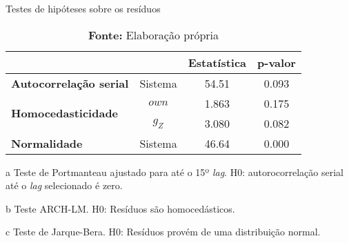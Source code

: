 \begin{table}[H]
\centering
\caption{Testes de hipóteses sobre os resíduos}
\label{testes_resduos}
	\begin{threeparttable}
\begin{tabular}{l|c|c|c}
\hline
\multicolumn{2}{l|}{} & \textbf{Estatística} & \textbf{p-valor} \\ \hline
\textbf{Autocorrelação serial}\tnote{a} & Sistema & 54.51 & 0.093 \\ \hline
\multirow{2}{*}{\textbf{Homocedasticidade}\tnote{b}} & $own$ & 1.863 & 0.175 \\ \cline{2-4} 
 & $g_Z$ & 3.080 & 0.082 \\ \hline
\textbf{Normalidade}\tnote{c} & Sistema & 46.64 & 0.000 \\ \hline
\end{tabular}%
\begin{tablenotes}\footnotesize
	\item [a] Teste de Portmanteau ajustado para até o 15º \textit{lag}. H0: autorocorrelação serial até o \textit{lag} selecionado é zero.
	\item [b] Teste ARCH-LM. H0: Resíduos são homocedásticos.
	\item [c] Teste de Jarque-Bera. H0: Resíduos provém de uma distribuição normal.
\end{tablenotes}
\end{threeparttable}
\caption*{\textbf{Fonte:} Elaboração própria}
\end{table}